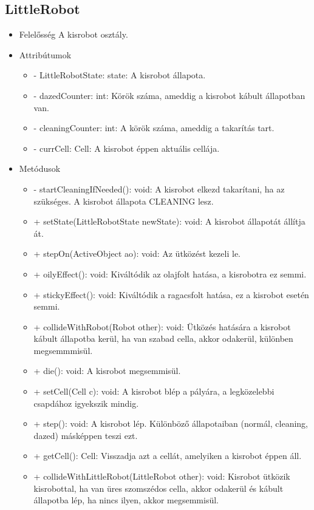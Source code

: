 \subsection{LittleRobot}
\begin{itemize}
	\item Felelősség
	A kisrobot osztály.
	
	\item Attribútumok
	\begin{itemize}
		\item - LittleRobotState: state: A kisrobot állapota.
		\item - dazedCounter: int: Körök száma, ameddig a kisrobot kábult állapotban van.
		\item - cleaningCounter: int: A körök száma, ameddig a takarítás tart.
		\item - currCell: Cell: A kisrobot éppen aktuális cellája.
	\end{itemize}
	\item Metódusok
	\begin{itemize}
		\item - startCleaningIfNeeded(): void: A kisrobot elkezd takarítani, ha az szükséges. A kisrobot állapota CLEANING lesz.
		\item + setState(LittleRobotState newState): void: A kisrobot állapotát állítja át.
		\item + stepOn(ActiveObject ao): void: Az ütközést kezeli le.
		\item + oilyEffect(): void: Kiváltódik az olajfolt hatása, a kisrobotra ez semmi.
		\item + stickyEffect(): void: Kiváltódik a ragacsfolt hatása, ez a kisrobot esetén semmi.
		\item + collideWithRobot(Robot other): void: Ütközés hatására a kisrobot kábult állapotba kerül, ha van szabad cella, akkor odakerül, különben megsemmmisül.
		\item + die(): void: A kisrobot megsemmisül.
		\item + setCell(Cell c): void: A kisrobot blép a pályára, a legközelebbi csapdához igyekszik mindig.
		\item + step(): void: A kisrobot lép. Különböző állapotaiban (normál, cleaning, dazed) másképpen teszi ezt.
		\item + getCell(): Cell: Visszadja azt a cellát, amelyiken a kisrobot éppen áll.
		\item + collideWithLittleRobot(LittleRobot other): void: Kisrobot ütközik kisrobottal, ha van üres szomszédos cella, akkor odakerül és kábult állapotba lép, ha nincs ilyen, akkor megsemmisül.
		
	\end{itemize}
\end{itemize}
